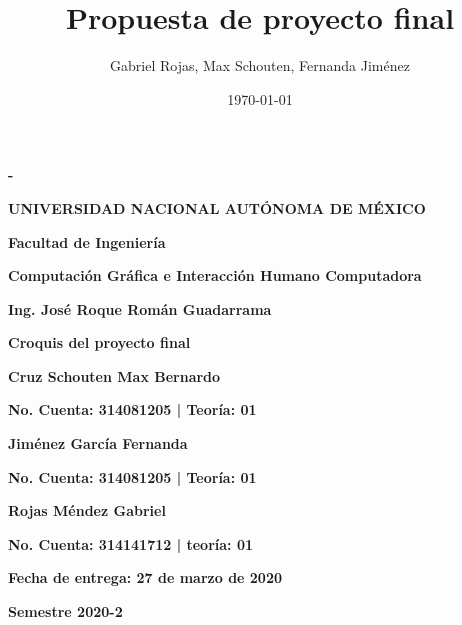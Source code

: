 \documentclass[12pt]{article} %
\title{Propuesta de proyecto final}
\author{Gabriel Rojas, Max Schouten, Fernanda Jiménez}
\date{\today}
\begin{document}
	\begin{titlepage}
		\thispagestyle{fancy}
		\centering
		{\bfseries - \par}
		\vspace{0.7cm}
		{\bfseries\LARGE UNIVERSIDAD NACIONAL AUTÓNOMA DE MÉXICO \par}
		\vspace{0.7cm}
		{\bfseries\LARGE Facultad de Ingeniería \par}
		\vspace{1cm}
		{\bfseries\LARGE Computación Gráfica e Interacción Humano Computadora \par}
		\vspace{0.5cm}
		{\bfseries\LARGE Ing. José Roque Román Guadarrama \par}
		\vspace{0.5cm}
		{\bfseries\LARGE Croquis del proyecto final \par}
		\vspace{0.5cm}
		{\bfseries\LARGE Cruz Schouten Max Bernardo \par}
		{\bfseries\Large No. Cuenta: 314081205 | Teoría: 01\par}
		{\bfseries\LARGE Jiménez García Fernanda \par}
		{\bfseries\Large No. Cuenta: 314081205 | Teoría: 01\par}
		{\bfseries\LARGE Rojas Méndez Gabriel \par}
		{\bfseries\Large No. Cuenta: 314141712 | teoría: 01\par}
		\vspace{1cm}
		{\bfseries\LARGE Fecha de entrega: 27 de marzo de 2020 \par}
		\vspace{1cm}
		{\bfseries\LARGE Semestre 2020-2 \par}
	\end{titlepage}
	
	\newpage
\end{document}
